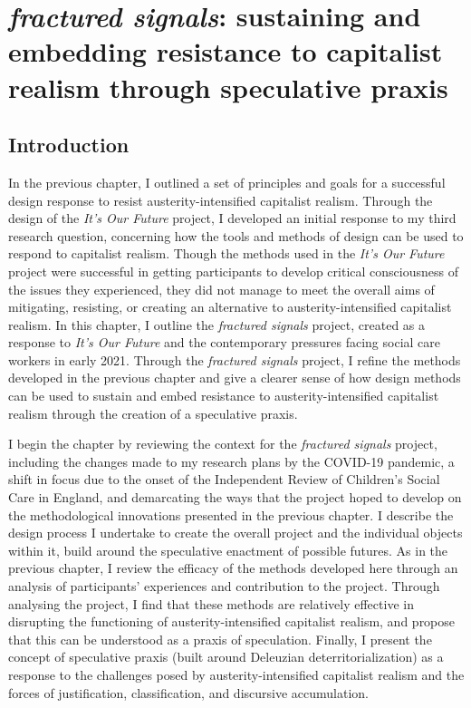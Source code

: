 \chapter{\textit{fractured signals}: sustaining and embedding resistance to capitalist realism through speculative praxis}
\label{ch:8}

\section{Introduction}
In the previous chapter, I outlined a set of principles and goals for a successful design response to resist austerity-intensified capitalist realism. Through the design of the \emph{It's Our Future} project, I developed an initial response to my third research question, concerning how the tools and methods of design can be used to respond to capitalist realism. Though the methods used in the \emph{It's Our Future} project were successful in getting participants to develop critical consciousness of the issues they experienced, they did not manage to meet the overall aims of mitigating, resisting, or creating an alternative to austerity-intensified capitalist realism. In this chapter, I outline the \emph{fractured signals} project, created as a response to \emph{It's Our Future} and the contemporary pressures facing social care workers in early 2021. Through the \emph{fractured signals} project, I refine the methods developed in the previous chapter and give a clearer sense of how design methods can be used to sustain and embed resistance to austerity-intensified capitalist realism through the creation of a speculative praxis.

I begin the chapter by reviewing the context for the \emph{fractured signals} project, including the changes made to my research plans by the COVID-19 pandemic, a shift in focus due to the onset of the Independent Review of Children's Social Care in England, and demarcating the ways that the project hoped to develop on the methodological innovations presented in the previous chapter. I describe the design process I undertake to create the overall project and the individual objects within it, build around the speculative enactment of possible futures. As in the previous chapter, I review the efficacy of the methods developed here through an analysis of participants' experiences and contribution to the project. Through analysing the project, I find that these methods are relatively effective in disrupting the functioning of austerity-intensified capitalist realism, and propose that this can be understood as a praxis of speculation. Finally, I present the concept of speculative praxis (built around Deleuzian deterritorialization) as a response to the challenges posed by austerity-intensified capitalist realism and the forces of justification, classification, and discursive accumulation.

